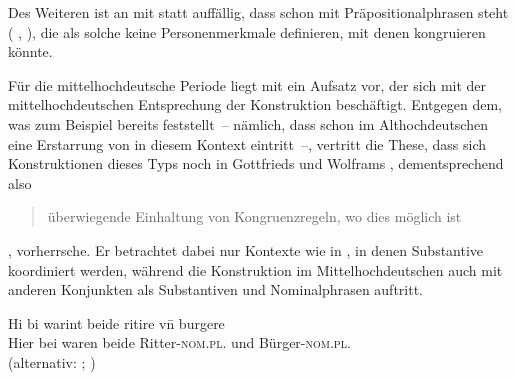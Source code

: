 Des Weiteren ist an  mit  statt 
 auffällig, dass   schon mit
Präpositionalphrasen steht (
,  ), die als solche keine
Personenmerkmale definieren, mit denen 
kongruieren könnte.

\begin{exe}
\end{exe}

Für die mittelhochdeutsche Periode liegt mit
\citet{askedal1974} ein Aufsatz vor, der sich mit der
mittelhochdeutschen Entsprechung der Konstruktion
 beschäftigt. Entgegen dem, was zum Beispiel bereits
\citet[433--434]{behaghel1923} feststellt~-- nämlich, dass schon im
Althochdeutschen eine Erstarrung von
 in diesem Kontext eintritt~--, vertritt \citeauthor{askedal1974}
die These, dass sich Konstruktionen dieses Typs noch in Gottfrieds
\nocite{maroldschroeder1969} und Wolframs
\nocite{lachmannhartl1952} , dementsprechend also
\blockcquote[37]{askedal1974}{überwiegende Einhaltung von Kongruenzregeln, wo
dies möglich ist}, vorherrsche. Er betrachtet dabei nur Kontexte wie in
, in denen Substantive
koordiniert werden, während die Konstruktion im
Mittelhochdeutschen auch mit anderen Konjunkten als
Substantiven und Nominalphrasen auftritt.

\begin{exe}
\ex\label{ex:mhdbeideunde2}
	\gll Hi bi warint beide ritire vn̄ burgere \\
		Hier bei waren beide Ritter-\textsc{nom.pl.\MascM} und
			Bürger-\textsc{nom.pl.\MascA} \\
	\trans %
		 (alternativ: ; \cites(Nr.~N~321, Rosheim,
		Dépt.~Bas-Rhin, 1286)[245,29]{cao5})
\end{exe}

